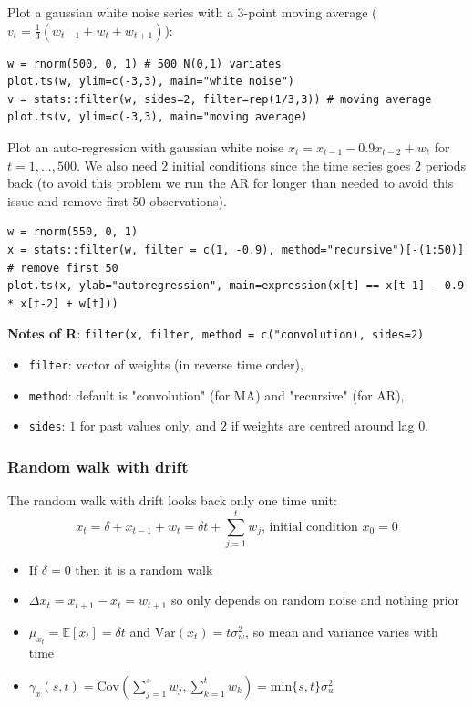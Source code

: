\documentclass[11pt]{article}
\newcommand{\noi}{\noindent}
\begin{document}
\noindent Plot a gaussian white noise series with a 3-point moving average ($v_t = \frac{1}{3}(w_{t-1}+w_t+w_{t+1})$):
\begin{lstlisting}
w = rnorm(500, 0, 1) # 500 N(0,1) variates
plot.ts(w, ylim=c(-3,3), main="white noise")
v = stats::filter(w, sides=2, filter=rep(1/3,3)) # moving average
plot.ts(v, ylim=c(-3,3), main="moving average)
\end{lstlisting}

\noindent Plot an auto-regression with gaussian white noise $x_t = x_{t-1}-0.9x_{t-2}+w_t$ for $t=1,...,500$. We also need $2$ initial conditions since the time series goes $2$ periods back (to avoid this problem we run the AR for longer than needed to avoid this issue and remove first $50$ observations).
\begin{lstlisting}
w = rnorm(550, 0, 1)
x = stats::filter(w, filter = c(1, -0.9), method="recursive")[-(1:50)] # remove first 50
plot.ts(x, ylab="autoregression", main=expression(x[t] == x[t-1] - 0.9 * x[t-2] + w[t]))
\end{lstlisting}

\noindent \textbf{Notes of R}: \texttt{filter(x, filter, method = c("convolution), sides=2)}
\begin{itemize}
    \item \texttt{filter}: vector of weights (in reverse time order),
    \item \texttt{method}: default is "convolution" (for MA) and "recursive" (for AR),
    \item \texttt{sides}: $1$ for past values only, and $2$ if weights are centred around lag $0$.
\end{itemize}

\subsubsection*{Random walk with drift}
\noi The random walk with drift looks back only one time unit:
$$x_t = \delta + x_{t-1} + w_t = \delta t + \sum_{j=1}^{t}{w_j} \text{, initial condition } x_0 = 0$$
\begin{itemize}
    \item If $\delta = 0$ then it is a random walk
    \item $\Delta x_t = x_{t+1} - x_t = w_{t+1}$ so only depends on random noise and nothing prior
    \item $\mu_{x_t} = \mathbb{E}[x_t] = \delta t$ and $\text{Var}(x_t) = t \sigma_w^2$, so mean and variance varies with time
    \item $\gamma_x(s,t) = \text{Cov}(\sum_{j=1}^s{w_j}, \sum_{k=1}^{t}w_k) = \text{min}\{s,t\}\sigma_w^2$
\end{itemize}
\end{document}
